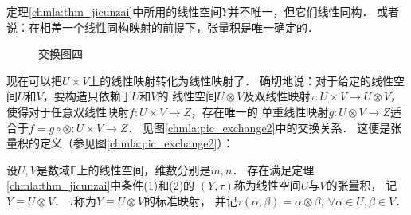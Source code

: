 \begin{proposition}\label{chmla:thm_unique}
    定理\ref{chmla:thm_jicunzai}中所用的线性空间$Y$并不唯一，但它们线性同构．
    或者说：在相差一个线性同构映射的前提下，张量积是唯一确定的．
\end{proposition}

\begin{figure}[htb]
    \begin{minipage}[t]{0.49\textwidth}
        \centering
        \caption{交换图三}\label{chmla:pic_exchange3}
    \end{minipage}
    \begin{minipage}[t]{0.49\textwidth}
        \caption{交换图四}\label{chmla:pic_exchange4}
    \end{minipage}
\end{figure}

现在可以把$U\times V$上的{}线性映射转化为{}线性映射了．
确切地说：对于给定的线性空间$U$和$V$，要构造只依赖于$U$和$V$的
线性空间$U\otimes V$及双线性映射$\tau:U\times V \to U\otimes V$，
使得对于任意双线性映射$f:U\times V \to Z$，存在唯一的
单重线性映射$g:U\otimes V\to Z$适合于$f=g\circ \otimes :U\times V \to Z$．
见图\ref{chmla:pic_exchange2}中的交换关系．
这便是张量积的定义（参见图\ref{chmla:pic_exchange2}）：
\begin{definition}\label{chmla:def_tensor-product}
    设$U,V$是数域$\mathbb{F}$上的线性空间，维数分别是$m,n$．
    存在满足定理\ref{chmla:thm_jicunzai}中条件(1)和(2)的
    $(Y,\tau)$称为线性空间$U$与$V$的{\heiti 张量积}，
    记$Y\equiv U\otimes V$．
    $\tau$称为$Y\equiv U\otimes V$的{\heiti 标准映射}，
    并记$\tau(\alpha,\beta)=\alpha \otimes \beta, \ \forall \alpha \in U, \beta \in V$．
\end{definition}

